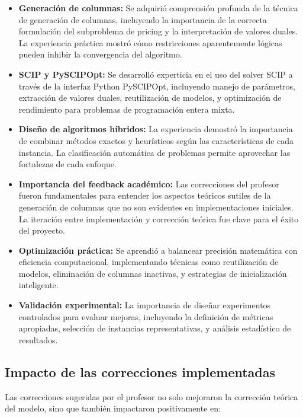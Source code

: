 \documentclass[a4paper,12pt]{article}
\begin{document}
\begin{itemize}
    \item \textbf{Generación de columnas:} Se adquirió comprensión profunda de la técnica de generación de columnas, incluyendo la importancia de la correcta formulación del subproblema de pricing y la interpretación de valores duales. La experiencia práctica mostró cómo restricciones aparentemente lógicas pueden inhibir la convergencia del algoritmo.

    \item \textbf{SCIP y PySCIPOpt:} Se desarrolló experticia en el uso del solver SCIP a través de la interfaz Python PySCIPOpt, incluyendo manejo de parámetros, extracción de valores duales, reutilización de modelos, y optimización de rendimiento para problemas de programación entera mixta.

    \item \textbf{Diseño de algoritmos híbridos:} La experiencia demostró la importancia de combinar métodos exactos y heurísticos según las características de cada instancia. La clasificación automática de problemas permite aprovechar las fortalezas de cada enfoque.

    \item \textbf{Importancia del feedback académico:} Las correcciones del profesor fueron fundamentales para entender los aspectos teóricos sutiles de la generación de columnas que no son evidentes en implementaciones iniciales. La iteración entre implementación y corrección teórica fue clave para el éxito del proyecto.

    \item \textbf{Optimización práctica:} Se aprendió a balancear precisión matemática con eficiencia computacional, implementando técnicas como reutilización de modelos, eliminación de columnas inactivas, y estrategias de inicialización inteligente.

    \item \textbf{Validación experimental:} La importancia de diseñar experimentos controlados para evaluar mejoras, incluyendo la definición de métricas apropiadas, selección de instancias representativas, y análisis estadístico de resultados.
\end{itemize}

\subsection*{Impacto de las correcciones implementadas}

Las correcciones sugeridas por el profesor no solo mejoraron la corrección teórica del modelo, sino que también impactaron positivamente en:
\end{document}
